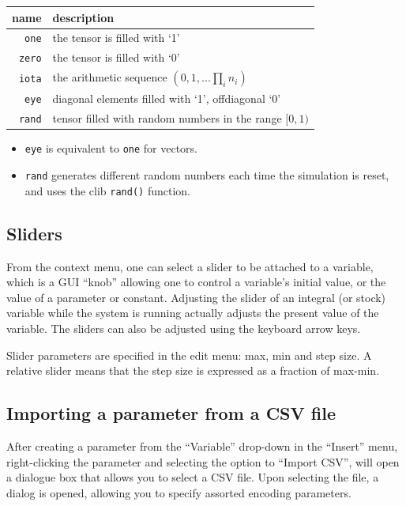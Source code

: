 \begin{tabular}{|r|l|}
  \hline
  name & description\\\hline
  \verb+one+ & the tensor is filled with `1'\\
  \verb+zero+ & the tensor is filled with `0'\\
  \verb+iota+ & the arithmetic sequence $(0,1,...\prod_in_i)$\\
  \verb+eye+ & diagonal elements filled with `1', offdiagonal `0'\\
  \verb+rand+ & tensor filled with random numbers in the range $[0,1)$\\
  \hline
\end{tabular}

\begin{itemize}
\item \verb+eye+ is equivalent to \verb+one+ for vectors.
\item \verb+rand+ generates different random numbers each time the
  simulation is reset, and uses the clib \verb+rand()+ function.
\end{itemize}


\subsection{Sliders}

From the context menu, one can select a slider to be attached to a
variable, which is a GUI ``knob'' allowing one to control a variable's
initial value, or the value of a parameter or constant. Adjusting the
slider of an integral (or stock) variable while the system is running
actually adjusts the present value of the variable. The sliders can
also be adjusted using the keyboard arrow keys.

Slider parameters are specified in the edit menu: max, min and step
size. A relative slider means that the step size is expressed as a
fraction of max-min.

\subsection{Importing a parameter from a CSV file}\label{CSV import}
\label{Operation:csvImport}

After creating a parameter from the ``Variable'' drop-down in the
``Insert'' menu, right-clicking the parameter and selecting the option
to ``Import CSV'', will open a dialogue box that allows you to select
a CSV file. Upon selecting the file, a dialog is opened, allowing you
to specify assorted encoding parameters.

